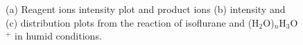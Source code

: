 \begin{figure}%
\centering
{}



\caption{(a) Reagent ions intensity plot and product ions  (b) intensity and (c) distribution plots from the reaction of isoflurane and (H$_2$O)$_n$H$_3$O$^+$ in humid conditions.}
\label{fig:isof_h3o_h}
\end{figure}


